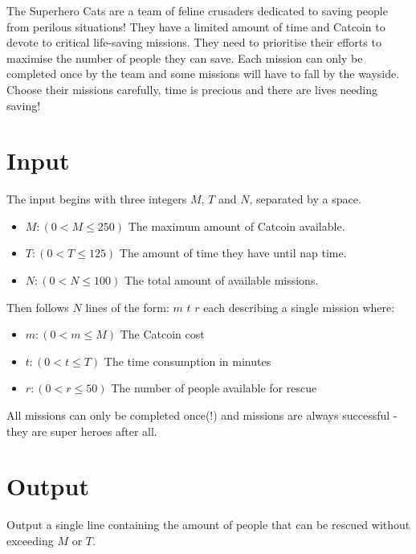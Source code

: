 
The Superhero Cats are a team of feline crusaders dedicated to saving people from perilous situations! They have a limited amount of time and Catcoin to devote to critical life-saving missions. They need to prioritise their efforts to maximise the number of people they can save. Each mission can only be completed once by the team and some missions will have to fall by the wayside. Choose their missions carefully, time is precious and there are lives needing saving!

\section*{Input}

The input begins with three integers $M$, $T$ and $N$, separated by a space.
\begin{itemize}
    \item {$M: (0 < M \le 250)$ The maximum amount of Catcoin available.}
    \item {$T: (0 < T \le 125)$ The amount of time they have until nap time.}
    \item {$N: (0 < N \le 100)$ The total amount of available missions.}
\end{itemize}

Then follows $N$ lines of the form: $m$ $t$ $r$ each describing a single mission where:
\begin{itemize}
    \item {$m: (0 < m \le M)$ The Catcoin cost}
    \item {$t: (0 < t \le T)$ The time consumption in minutes}
    \item {$r: (0 < r \le 50)$ The number of people available for rescue}
\end{itemize}

All missions can only be completed once(!) and missions are always successful - they are super heroes after all.

\section*{Output}

Output a single line containing the amount of people that can be rescued without exceeding $M$ or $T$.
